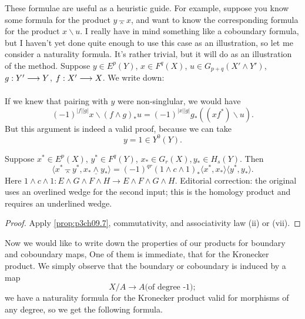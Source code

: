 \documentclass[../main]{subfiles}
\begin{document}
These formulae are useful as a heuristic guide. For example, suppose you know some formula for the product $y \barwedge x$, and want to know the corresponding formula for the product $x \backslash u$. I really have in mind something like a coboundary formula, but I haven't yet done quite enough to use this case as an illustration, so let me consider a naturality formula. It's rather trivial, but it will do as an illustration of the method. Suppose $y \in E^p(Y)$, $x \in F^q(X)$, $u \in G_{p + q}(X' \wedge Y')$, $g : Y' \lar{} Y$, $f : X' \lar{} X$. We write down:
\begin{center}
\end{center}
If we knew that pairing with $y$ were non-singlular, we would have \[(-1)^{|f||g|}x\backslash(f\wedge g)_\ast u=(-1)^{|x||g|}g_\ast((xf^\ast)\backslash u).\] But this argument is indeed a valid proof, because we can take \[y=1 \in Y^0(Y).\]
\begin{proposition}\label{prop:p3ch09.8}
    Suppose $x^\ast \in E^p(X)$, $y^\ast \in F^q(Y)$, $x_\ast \in G_r(X), y_\ast \in H_s(Y)$. Then \[\langle x^\ast \barwedge y^\ast, x_\ast \underline\wedge y_\ast\rangle = (-1)^{qr}(1 \wedge c \wedge 1)_\ast \langle x^\ast,x_\ast\rangle\langle y^\ast,y_\ast\rangle .\] Here $1 \wedge c \wedge 1: E \wedge G \wedge F \wedge H \longrightarrow E \wedge F \wedge G \wedge H. $
    \noindent Editorial correction: the original uses an overlined wedge for the second input; this is the homology product and requires an underlined wedge.
\end{proposition}

\begin{proof}
Apply \ref{prop:p3ch09.7}, commutativity, and associativity law (ii) or (vii).
\end{proof}

Now we would like to write down the properties of our products for boundary and coboundary maps, One of them is immediate, that for the Kronecker product. We simply observe that the boundary or coboundary is induced by a map \[ X/A \longrightarrow A \text{(of degree -1)};\] we have a naturality formula for the Kronecker product valid for morphisms of any degree, so we get the following formula.
\end{document}
